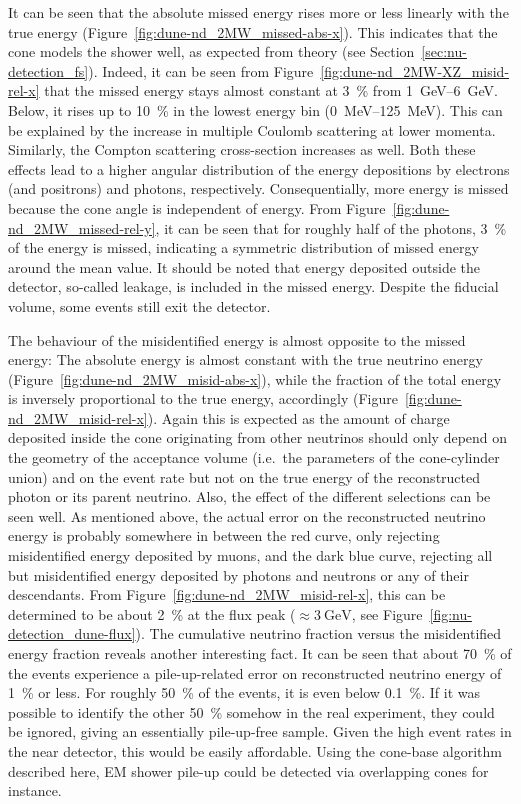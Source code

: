 It can be seen that the absolute missed energy rises more or less linearly with the true energy (Figure~\ref{fig:dune-nd_2MW_missed-abs-x}).
This indicates that the cone models the shower well, as expected from theory (see Section~\ref{sec:nu-detection_fs}).
Indeed, it can be seen from Figure~\ref{fig:dune-nd_2MW-XZ_misid-rel-x} that the missed energy stays almost constant at \SI{3}{\percent} from \SIrange{1}{6}{\giga\electronvolt}.
Below, it rises up to \SI{10}{\percent} in the lowest energy bin (\SIrange{0}{125}{\mega\electronvolt}).
This can be explained by the increase in multiple Coulomb scattering at lower momenta.
Similarly, the Compton scattering cross-section increases as well.
Both these effects lead to a higher angular distribution of the energy depositions by electrons (and positrons) and photons, respectively.
Consequentially, more energy is missed because the cone angle is independent of energy.
From Figure~\ref{fig:dune-nd_2MW_missed-rel-y}, it can be seen that for roughly half of the photons, \SI{3}{\percent} of the energy is missed, indicating a symmetric distribution of missed energy around the mean value.
It should be noted that energy deposited outside the detector, so-called leakage, is included in the missed energy.
Despite the fiducial volume, some events still exit the detector.

The behaviour of the misidentified energy is almost opposite to the missed energy: The absolute energy is almost constant with the true neutrino energy (Figure~\ref{fig:dune-nd_2MW_misid-abs-x}), while the fraction of the total energy is inversely proportional to the true energy, accordingly (Figure~\ref{fig:dune-nd_2MW_misid-rel-x}).
Again this is expected as the amount of charge deposited inside the cone originating from other neutrinos should only depend on the geometry of the acceptance volume (i.e.\ the parameters of the cone-cylinder union) and on the event rate but not on the true energy of the reconstructed photon or its parent neutrino.
Also, the effect of the different selections can be seen well.
As mentioned above, the actual error on the reconstructed neutrino energy is probably somewhere in between the red curve, only rejecting misidentified energy deposited by muons, and the dark blue curve, rejecting all but misidentified energy deposited by photons and neutrons or any of their descendants.
From Figure~\ref{fig:dune-nd_2MW_misid-rel-x}, this can be determined to be about \SI{2}{\percent} at the flux peak ($\approx \SI{3}{\giga\electronvolt}$, see Figure~\ref{fig:nu-detection_dune-flux}).
The cumulative neutrino fraction versus the misidentified energy fraction reveals another interesting fact.
It can be seen that about \SI{70}{\percent} of the events experience a pile-up-related error on reconstructed neutrino energy of \SI{1}{\percent} or less.
For roughly \SI{50}{\percent} of the events, it is even below \SI{0.1}{\percent}.
If it was possible to identify the other \SI{50}{\percent} somehow in the real experiment, they could be ignored, giving an essentially pile-up-free sample.
Given the high event rates in the near detector, this would be easily affordable.
Using the cone-base algorithm described here, EM shower pile-up could be detected via overlapping cones for instance.

